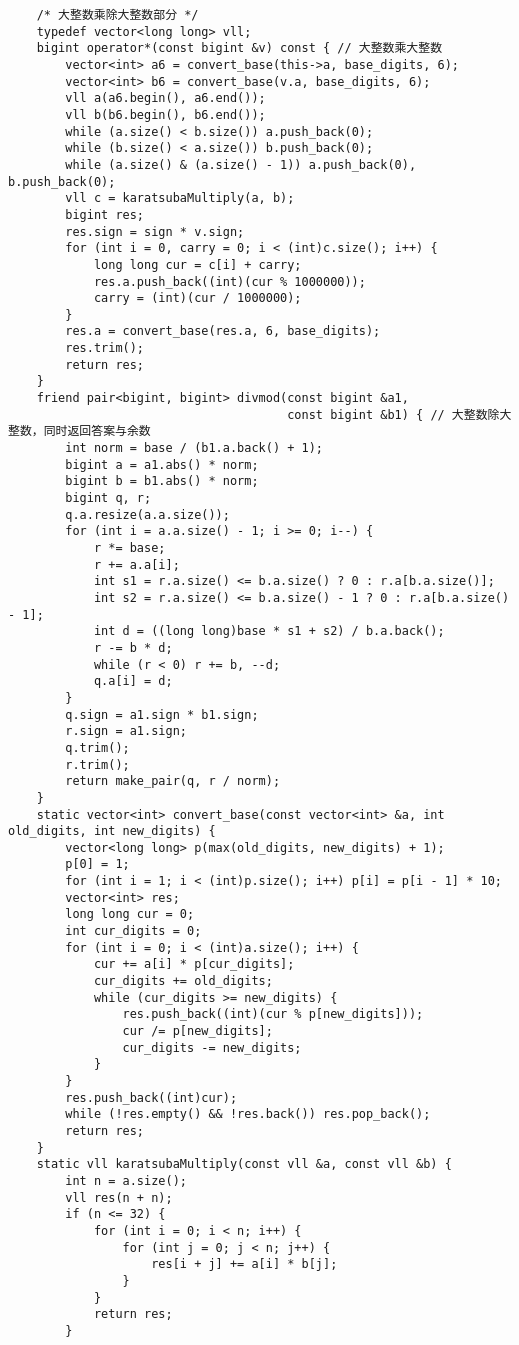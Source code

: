 \documentclass[a4paper,10pt]{article}
\begin{document}
\begin{lstlisting}
    /* 大整数乘除大整数部分 */
    typedef vector<long long> vll;
    bigint operator*(const bigint &v) const { // 大整数乘大整数
        vector<int> a6 = convert_base(this->a, base_digits, 6);
        vector<int> b6 = convert_base(v.a, base_digits, 6);
        vll a(a6.begin(), a6.end());
        vll b(b6.begin(), b6.end());
        while (a.size() < b.size()) a.push_back(0);
        while (b.size() < a.size()) b.push_back(0);
        while (a.size() & (a.size() - 1)) a.push_back(0), b.push_back(0);
        vll c = karatsubaMultiply(a, b);
        bigint res;
        res.sign = sign * v.sign;
        for (int i = 0, carry = 0; i < (int)c.size(); i++) {
            long long cur = c[i] + carry;
            res.a.push_back((int)(cur % 1000000));
            carry = (int)(cur / 1000000);
        }
        res.a = convert_base(res.a, 6, base_digits);
        res.trim();
        return res;
    }
    friend pair<bigint, bigint> divmod(const bigint &a1,
                                       const bigint &b1) { // 大整数除大整数，同时返回答案与余数
        int norm = base / (b1.a.back() + 1);
        bigint a = a1.abs() * norm;
        bigint b = b1.abs() * norm;
        bigint q, r;
        q.a.resize(a.a.size());
        for (int i = a.a.size() - 1; i >= 0; i--) {
            r *= base;
            r += a.a[i];
            int s1 = r.a.size() <= b.a.size() ? 0 : r.a[b.a.size()];
            int s2 = r.a.size() <= b.a.size() - 1 ? 0 : r.a[b.a.size() - 1];
            int d = ((long long)base * s1 + s2) / b.a.back();
            r -= b * d;
            while (r < 0) r += b, --d;
            q.a[i] = d;
        }
        q.sign = a1.sign * b1.sign;
        r.sign = a1.sign;
        q.trim();
        r.trim();
        return make_pair(q, r / norm);
    }
    static vector<int> convert_base(const vector<int> &a, int old_digits, int new_digits) {
        vector<long long> p(max(old_digits, new_digits) + 1);
        p[0] = 1;
        for (int i = 1; i < (int)p.size(); i++) p[i] = p[i - 1] * 10;
        vector<int> res;
        long long cur = 0;
        int cur_digits = 0;
        for (int i = 0; i < (int)a.size(); i++) {
            cur += a[i] * p[cur_digits];
            cur_digits += old_digits;
            while (cur_digits >= new_digits) {
                res.push_back((int)(cur % p[new_digits]));
                cur /= p[new_digits];
                cur_digits -= new_digits;
            }
        }
        res.push_back((int)cur);
        while (!res.empty() && !res.back()) res.pop_back();
        return res;
    }
    static vll karatsubaMultiply(const vll &a, const vll &b) {
        int n = a.size();
        vll res(n + n);
        if (n <= 32) {
            for (int i = 0; i < n; i++) {
                for (int j = 0; j < n; j++) {
                    res[i + j] += a[i] * b[j];
                }
            }
            return res;
        }


\end{lstlisting}
\end{document}
